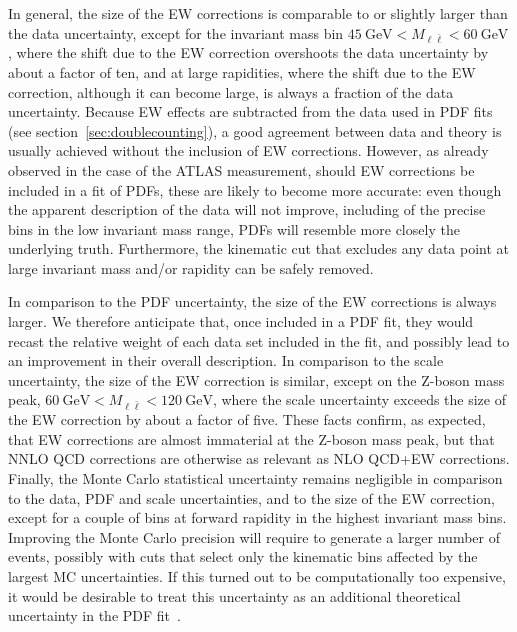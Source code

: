 In general, the size of the EW corrections is comparable to or slightly larger
than the data uncertainty, except for the invariant mass bin 
$\SI{45}{\giga\electronvolt}<M_{\ell\bar\ell}<\SI{60}{\giga\electronvolt}$,
where the shift due to the EW correction overshoots the data uncertainty by
about a factor of ten, and at large rapidities, where the shift due to the EW
correction, although it can become large, is always a fraction of the data
uncertainty. Because EW effects are subtracted from the data used
in PDF fits (see section~\ref{sec:doublecounting}), a good agreement between
data and theory is usually achieved without the inclusion of EW corrections.
However, as already observed in the case of the ATLAS measurement, should EW
corrections be included in a fit of PDFs, these are likely to become more
accurate: even though the apparent description of the data will not
improve, including of the precise bins in the low invariant mass range, PDFs
will resemble more closely the underlying truth. Furthermore, the kinematic cut
that excludes any data point at large invariant mass and/or rapidity can be
safely removed.

In comparison to the PDF uncertainty, the size of the EW corrections is always
larger. We therefore anticipate that, once included in a PDF fit, they would
recast the relative weight of each data set included in the fit, and possibly
lead to an improvement in their overall description. In comparison to the scale
uncertainty, the size of the EW correction is similar, except on the Z-boson
mass peak, $\SI{60}{\giga\electronvolt}<M_{\ell\bar\ell}<\SI{120}{\giga\electronvolt}$, where the scale uncertainty exceeds
the size of the EW correction by about a factor of five. These facts confirm,
as expected, that EW corrections are almost immaterial at the Z-boson mass
peak, but that NNLO QCD corrections are otherwise as relevant as NLO QCD+EW
corrections. Finally, the Monte Carlo statistical uncertainty remains negligible
in comparison to the data, PDF and scale uncertainties, and to the size of the
EW correction, except for a couple of bins at forward rapidity in the highest
invariant mass bins. Improving the Monte Carlo precision will require to
generate a larger number of events, possibly with cuts that select
only the kinematic bins affected by the largest MC uncertainties. If this
turned out to be computationally too expensive, it would be desirable to treat
this uncertainty as an additional theoretical uncertainty in the PDF
fit~\cite{Ball:2018lag}.

